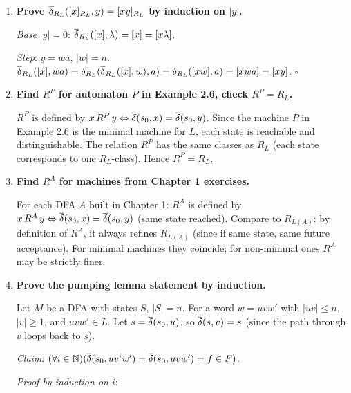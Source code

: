 \begin{enumerate}[{2.}1.]
$\delta_{R_L}([x]_{R_L}, a) = [xa]_{R_L}$. We must show: if $[x]_{R_L}=[y]_{R_L}$, then $[xa]_{R_L}=[ya]_{R_L}$. Since $x\,R_L\,y$, for any $z$: $xaz\in L\Leftrightarrow x(az)\in L\Leftrightarrow y(az)\in L\Leftrightarrow yaz\in L$. Thus $xa\,R_L\,ya$. $\square$

\item \textbf{Prove $\overline{\delta}_{R_L}([x]_{R_L},y)=[xy]_{R_L}$ by induction on $|y|$.}

\textit{Base} $|y|=0$: $\overline{\delta}_{R_L}([x],\lambda)=[x]=[x\lambda]$. \checkmark

\textit{Step}: $y=wa$, $|w|=n$. $\overline{\delta}_{R_L}([x],wa)=\delta_{R_L}(\overline{\delta}_{R_L}([x],w),a)=\delta_{R_L}([xw],a)=[xwa]=[xy]$. $\square$

\item \textbf{Find $R^P$ for automaton $P$ in Example 2.6, check $R^P=R_L$.}

$R^P$ is defined by $x\,R^P\,y\Leftrightarrow\overline{\delta}(s_0,x)=\overline{\delta}(s_0,y)$. Since the machine $P$ in Example 2.6 is the minimal machine for $L$, each state is reachable and distinguishable. The relation $R^P$ has the same classes as $R_L$ (each state corresponds to one $R_L$-class). Hence $R^P=R_L$.

\item \textbf{Find $R^A$ for machines from Chapter 1 exercises.}

For each DFA $A$ built in Chapter 1: $R^A$ is defined by $x\,R^A\,y\Leftrightarrow\overline{\delta}(s_0,x)=\overline{\delta}(s_0,y)$ (same state reached). Compare to $R_{L(A)}$: by definition of $R^A$, it always refines $R_{L(A)}$ (since if same state, same future acceptance). For minimal machines they coincide; for non-minimal ones $R^A$ may be strictly finer.

\item \textbf{Prove the pumping lemma statement by induction.}

Let $M$ be a DFA with states $S$, $|S|=n$. For a word $w=uvw'$ with $|uv|\leq n$, $|v|\geq 1$, and $uvw'\in L$. Let $s=\overline{\delta}(s_0,u)$, so $\overline{\delta}(s,v)=s$ (since the path through $v$ loops back to $s$).

\textit{Claim}: $(\forall i\in\mathbb{N})(\overline{\delta}(s_0,uv^iw')=\overline{\delta}(s_0,uvw')=f\in F)$.

\textit{Proof by induction on $i$}:


\end{enumerate}
